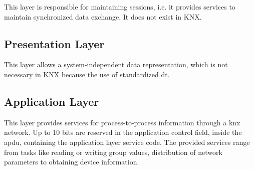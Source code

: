 This layer is responsible for maintaining sessions, i.e. it provides services to maintain synchronized data exchange. It does not exist in KNX.

\subsection{Presentation Layer}

This layer allows a system-independent data representation, which is not necessary in KNX because the use of standardized \gls{dt}.

\subsection{Application Layer}

This layer provides services for process-to-process information through a \gls{knx} network. Up to 10 bits are reserved in the application control field,
inside the \gls{apdu}, containing the application layer service code. The provided services range from tasks like reading or writing group values, distribution of network
parameters to obtaining device information.